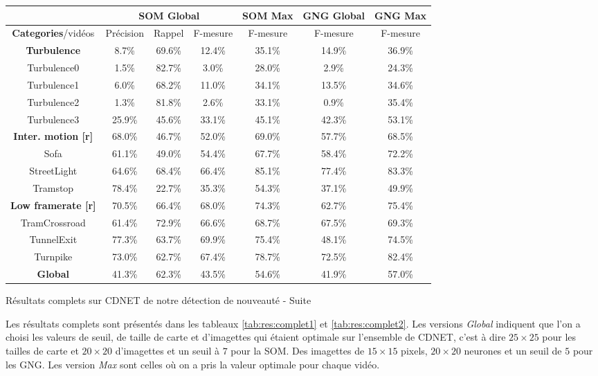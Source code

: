 	\begin{tableth}
    \begin{tabular}{|c|c|c|c|c|c|c|}
		\hline
		& \multicolumn{3}{c|}{SOM Global} & SOM Max & GNG Global & GNG Max\\
        \hline
        \textbf{Categories}/vidéos & Précision & Rappel & F-mesure & F-mesure & F-mesure & F-mesure\\
		\hline
        \textbf{Turbulence} & 8.7\% & 69.6\% & 12.4\% & 35.1\% & 14.9\% & 36.9\% \\
		\hline
		Turbulence0 & 1.5\% & 82.7\% & 3.0\% & 28.0\% & 2.9\% & 24.3\% \\
		Turbulence1 & 6.0\% & 68.2\% & 11.0\% & 34.1\% & 13.5\% & 34.6\% \\
		Turbulence2 & 1.3\% & 81.8\% & 2.6\% & 33.1\% & 0.9\% & 35.4\% \\
		Turbulence3 & 25.9\% & 45.6\% & 33.1\% & 45.1\% & 42.3\% & 53.1\% \\
		\hline
		\textbf{Inter. motion [r]} & 68.0\% & 46.7\% & 52.0\% & 69.0\% & 57.7\% & 68.5\% \\
		\hline
		Sofa & 61.1\% & 49.0\% & 54.4\% & 67.7\% & 58.4\% & 72.2\% \\
		StreetLight & 64.6\% & 68.4\% & 66.4\% & 85.1\% & 77.4\% & 83.3\% \\
		Tramstop & 78.4\% & 22.7\% & 35.3\% & 54.3\% & 37.1\% & 49.9\% \\
		\hline
        \textbf{Low framerate [r]} & 70.5\% & 66.4\% & 68.0\% & 74.3\% & 62.7\% & 75.4\% \\
		\hline
		TramCrossroad & 61.4\% & 72.9\% & 66.6\% & 68.7\% & 67.5\% & 69.3\% \\
		TunnelExit & 77.3\% & 63.7\% & 69.9\% & 75.4\% & 48.1\% & 74.5\% \\
		Turnpike & 73.0\% & 62.7\% & 67.4\% & 78.7\% & 72.5\% & 82.4\% \\
        \hline
        \textbf{Global} & 41.3\% & 62.3\% & 43.5\% & 54.6\% & 41.9\% & 57.0\% \\
    	\hline
	\end{tabular}
	\caption{Résultats complets sur CDNET de notre détection de nouveauté - Suite}
	\label{tab:res:complet2}
	\end{tableth}

	Les résultats complets sont présentés dans les tableaux \ref{tab:res:complet1} et \ref{tab:res:complet2}. Les versions \textit{Global} indiquent que l'on a choisi les valeurs de seuil, de taille de carte et d'imagettes qui étaient optimale sur l'ensemble de CDNET, c'est à dire $25\times25$ pour les tailles de carte et $20\times20$ d'imagettes et un seuil à $7$ pour la SOM. Des imagettes de $15\times15$ pixels, $20\times20$ neurones et un seuil de $5$ pour les GNG. Les version \textit{Max} sont celles où on a pris la valeur optimale pour chaque vidéo.

